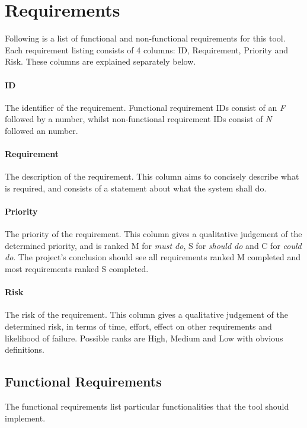 \section{Requirements}

Following is a list of functional and non-functional requirements for this tool. Each requirement listing consists of 4 columns: ID, Requirement, Priority and Risk. These columns are explained separately below.

\paragraph{ID}
The identifier of the requirement.
Functional requirement IDs consist of an \emph{F} followed by a number, whilst non-functional requirement IDs consist of \emph{N} followed an number.

\paragraph{Requirement}
The description of the requirement.
This column aims to concisely describe what is required, and consists of a statement about what the system shall do.

\paragraph{Priority}
The priority of the requirement.
This column gives a qualitative judgement of the determined priority, and is ranked M for \emph{must do}, S for \emph{should do} and C for \emph{could do}.
The project's conclusion should see all requirements ranked M completed and most requirements ranked S completed.

\paragraph{Risk}
The risk of the requirement.
This column gives a qualitative judgement of the determined risk, in terms of time, effort, effect on other requirements and likelihood of failure.
Possible ranks are High, Medium and Low with obvious definitions.

\subsection{Functional Requirements}

The functional requirements list particular functionalities that the tool should implement.

